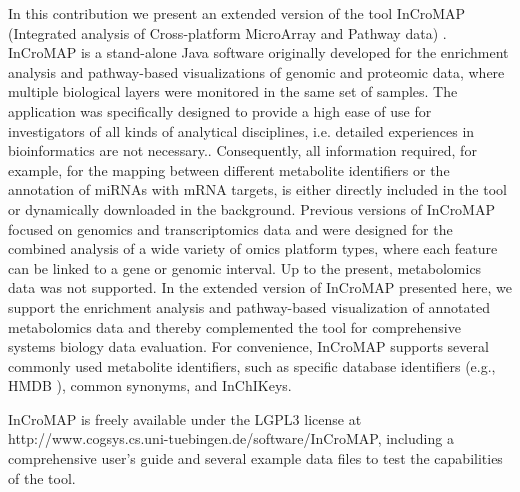 \documentclass[final,5p,times,twocolumn]{elsarticle}
\newcommand\red[1]{{\color{red}#1}}
\begin{document}
In this contribution we present an extended version of the tool InCroMAP \red{(Integrated analysis of Cross-platform MicroArray and Pathway data)} \cite{Wrzodek2012a,Wrzodek2012b}. InCroMAP is a stand-alone Java software originally developed for the enrichment analysis and pathway-based visualizations of genomic and proteomic data, where multiple biological layers were monitored in the same set of samples. \red{The application was specifically designed to provide a high ease of use for investigators of all kinds of analytical disciplines, i.e. detailed experiences in bioinformatics are not necessary.}. Consequently, all information required, for example, for the mapping between different metabolite identifiers or the annotation of miRNAs with mRNA targets, is either directly included in the tool or dynamically downloaded in the background. Previous versions of InCroMAP focused on genomics and transcriptomics data and were designed for the combined analysis of a wide variety of omics platform types, where each feature can be linked to a gene or genomic interval. Up to the present, metabolomics data was not supported. In the extended version of InCroMAP presented here, we support the enrichment analysis and pathway-based visualization of annotated metabolomics data and thereby complemented the tool for comprehensive systems biology data evaluation. For convenience, InCroMAP supports several commonly used metabolite identifiers, such as specific database identifiers (e.g., HMDB \cite{Wishart2009}), common synonyms, and InChIKeys. 

InCroMAP is freely available under the LGPL3 license at http://www.cogsys.cs.uni-tuebingen.de/software/InCroMAP, including a comprehensive user’s guide and several example data files to test the capabilities of the tool.
\end{document}
